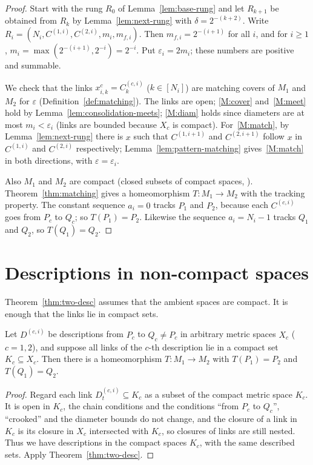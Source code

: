 \begin{proof}
Start with the rung $R_0$ of Lemma~\ref{lem:base-rung} and let $R_{k+1}$ be obtained from $R_k$ by Lemma~\ref{lem:next-rung}
with $\delta=2^{-(k+2)}$. Write $R_i=(N_i,C^{(1,i)},C^{(2,i)},m_i,m_{f,i})$. Then $m_{f,i}=2^{-(i+1)}$ for all $i$, and for
$i\ge1$, $m_i=\max(2^{-(i+1)},2^{-i})=2^{-i}$. Put $\varepsilon_i=2m_i$; these numbers are positive and summable.

We check that the links $x^c_{i,k}=C^{(c,i)}_k$ ($k\in[N_i]$) are matching covers of $M_1$ and $M_2$ for $\varepsilon$
(Definition~\ref{def:matching}). The links are open; \ref{M:cover} and~\ref{M:meet} hold by Lemma~\ref{lem:consolidation-meets};
\ref{M:diam} holds since diameters are at most $m_i<\varepsilon_i$ (links are bounded because $X_c$ is compact). For~\ref{M:match}, by
Lemma~\ref{lem:next-rung} there is $x$ such that $C^{(1,i+1)}$ and $C^{(2,i+1)}$ follow $x$ in $C^{(1,i)}$ and $C^{(2,i)}$
respectively; Lemma~\ref{lem:pattern-matching} gives~\ref{M:match} in both directions, with $\varepsilon=\varepsilon_i$.

Also $M_1$ and $M_2$ are compact (closed subsets of compact spaces, ). Theorem~\ref{thm:matching} gives a
homeomorphism $T\colon M_1\to M_2$ with the tracking property. The constant sequence $a_i=0$ tracks $P_1$ and $P_2$, because each
$C^{(c,i)}$ goes from $P_c$ to $Q_c$; so $T(P_1)=P_2$. Likewise the sequence $a_i=N_i-1$ tracks $Q_1$ and $Q_2$, so $T(Q_1)=Q_2$.
\end{proof}

\section{Descriptions in non-compact spaces}

Theorem~\ref{thm:two-desc} assumes that the ambient spaces are compact. It is enough that the links lie in compact sets.

\begin{corollary}\label{cor:two-desc-K}
Let $D^{(c,i)}$ be descriptions from $P_c$ to $Q_c\ne P_c$ in arbitrary metric spaces $X_c$ ($c=1,2$), and suppose all links of the
$c$-th description lie in a compact set $K_c\subseteq X_c$. Then there is a homeomorphism $T\colon M_1\to M_2$ with $T(P_1)=P_2$ and
$T(Q_1)=Q_2$.
\end{corollary}

\begin{proof}
Regard each link $D^{(c,i)}_t\subseteq K_c$ as a subset of the compact metric space $K_c$. It is open in $K_c$, the chain conditions
and the conditions ``from $P_c$ to $Q_c$'', ``crooked'' and the diameter bounds do not change, and the closure of a link in $K_c$ is its
closure in $X_c$ intersected with $K_c$, so closures of links are still nested. Thus we have descriptions in the compact spaces $K_c$,
with the same described sets. Apply Theorem~\ref{thm:two-desc}.
\end{proof}

